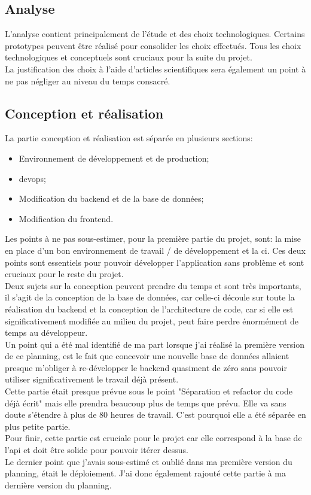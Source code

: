 \documentclass[
    iai, %
    il, %
]{heig-tb}
\begin{document}
\subsection{Analyse}
L'analyse contient principalement de l'étude et des choix technologiques. Certains prototypes peuvent être réalisé pour consolider les choix effectués. Tous les choix technologiques et conceptuels sont cruciaux pour la suite du projet.\\
La justification des choix à l'aide d'articles scientifiques sera également un point à ne pas négliger au niveau du temps consacré.

\subsection{Conception et réalisation}
La partie conception et réalisation est séparée en plusieurs sections:
\begin{itemize}
    \item Environnement de développement et de production;
    \item \Gls{devops};
    \item Modification du \Gls{backend} et de la base de données;
    \item Modification du \Gls{frontend}.
\end{itemize}

Les points à ne pas sous-estimer, pour la première partie du projet, sont: la mise en place d'un bon environnement de travail / de développement et la \Gls{ci}. Ces deux points sont essentiels pour pouvoir développer l'application sans problème et sont cruciaux pour le reste du projet. \\
Deux sujets sur la conception peuvent prendre du temps et sont très importants, il s'agit de la conception de la base de données, car celle-ci découle sur toute la réalisation du \Gls{backend} et la conception de l'architecture de code, car si elle est significativement modifiée au milieu du projet, peut faire perdre énormément de temps au développeur.\\
Un point qui a été mal identifié de ma part lorsque j'ai réalisé la première version de ce planning,
est le fait que concevoir une nouvelle base de données allaient presque m'obliger à
re-développer le \Gls{backend} quasiment de zéro sans pouvoir utiliser significativement le travail déjà
présent.\\
Cette partie était presque prévue sous le point "Séparation et refactor du code déjà écrit" mais
elle prendra beaucoup plus de temps que prévu. Elle va sans doute s'étendre à plus de 80 heures de
travail. C'est pourquoi elle a été séparée en plus petite partie. \\
Pour finir, cette partie est cruciale pour le projet car elle correspond à la base de l'\Gls{api} et doit être solide pour pouvoir itérer dessus. \\
Le dernier point que j'avais sous-estimé et oublié dans ma première version du planning, était le déploiement. J'ai donc également rajouté cette partie à ma dernière version du planning.
\end{document}
